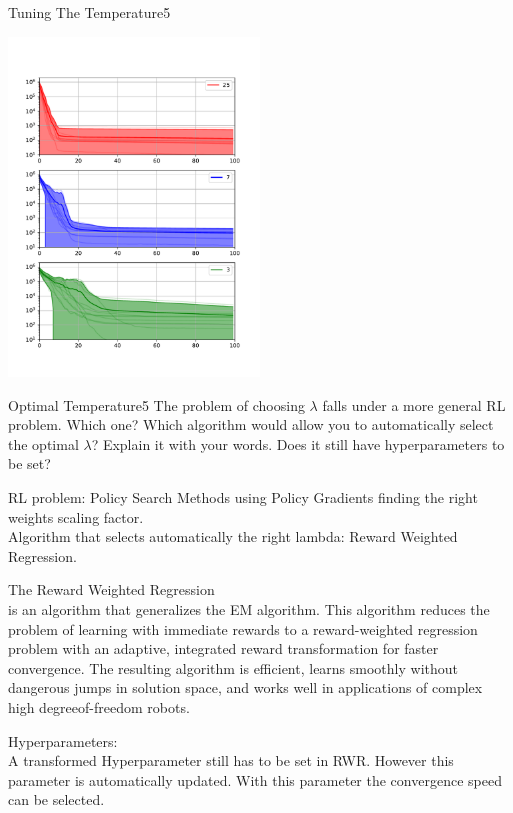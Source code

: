 \begin{questions}
\begin{question}{Tuning The Temperature}{5}
\begin{center}
	\includegraphics[width=0.5\textwidth]{img/EM-c.pdf}
\end{center}

\end{question}


\begin{question}[bonus]{Optimal Temperature}{5}
The problem of choosing $\lambda$ falls under a more general RL problem. Which one?
Which algorithm would allow you to automatically select the optimal $\lambda$? Explain it with your words.
Does it still have hyperparameters to be set?

\begin{answer}
RL problem: Policy Search Methods using Policy Gradients finding the right weights scaling factor. 
\\
 Algorithm that selects automatically the right lambda: Reward Weighted Regression.

The Reward Weighted Regression\\ is an algorithm that generalizes the EM algorithm. This algorithm reduces the problem of learning with immediate rewards to a reward-weighted regression problem with an adaptive, integrated reward transformation for faster convergence.  The resulting algorithm is efficient, learns smoothly without
dangerous jumps in solution space, and works well in applications of complex high degreeof-freedom robots.

Hyperparameters:\\
A transformed Hyperparameter still has to be set in RWR. However this parameter is automatically updated. With this parameter the convergence speed can be selected.
\end{answer}


\end{question}


\end{questions}

